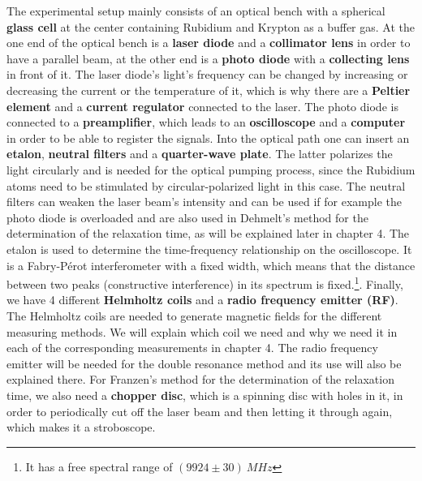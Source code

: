 The experimental setup mainly consists of an optical bench with a spherical \textbf{glass cell} at the center containing Rubidium and Krypton as a buffer gas. At the one end of the optical bench is a \textbf{laser diode} and a \textbf{collimator lens} in order to have a parallel beam, at the other end is a \textbf{photo diode} with a \textbf{collecting lens} in front of it. The laser diode's light's frequency can be changed by increasing or decreasing the current or the temperature of it, which is why there are a \textbf{Peltier element} and a \textbf{current regulator} connected to the laser. The photo diode is connected to a \textbf{preamplifier}, which leads to an \textbf{oscilloscope} and a \textbf{computer} in order to be able to register the signals. Into the optical path one can insert an \textbf{etalon}, \textbf{neutral filters} and a \textbf{quarter-wave plate}. The latter polarizes the light circularly and is needed for the optical pumping process, since the Rubidium atoms need to be stimulated by circular-polarized light in this case. The neutral filters can weaken the laser beam's intensity and can be used if for example the photo diode is overloaded and are also used in Dehmelt's method for the determination of the relaxation time, as will be explained later in chapter 4. The etalon is used to determine the time-frequency relationship on the oscilloscope. It is a Fabry-Pérot interferometer with a fixed width, which means that the distance between two peaks (constructive interference) in its spectrum is fixed.\footnote{It has a free spectral range of $(9924 \pm 30)\ MHz$}. Finally, we have 4 different \textbf{Helmholtz coils} and a \textbf{radio frequency emitter (RF)}. The Helmholtz coils are needed to generate magnetic fields for the different measuring methods. We will explain which coil we need and why we need it in each of the corresponding measurements in chapter 4. The radio frequency emitter will be needed for the double resonance method and its use will also be explained there. For Franzen's method for the determination of the relaxation time, we also need a \textbf{chopper disc}, which is a spinning disc with holes in it, in order to periodically cut off the laser beam and then letting it through again, which makes it a stroboscope.

\clearpage